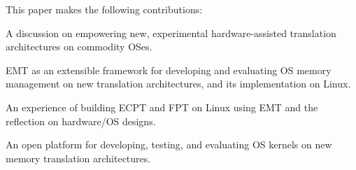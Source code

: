 
 This paper makes the following contributions:
\begin{packed_itemize}%
	\item A discussion on empowering new, experimental hardware-assisted translation architectures
		on commodity OSes.
	\item EMT as an extensible framework for developing and evaluating OS memory management 
		on new translation architectures,
		and its implementation on Linux.
	\item An experience of building ECPT and FPT on Linux using EMT and the reflection 
		on hardware/OS designs.
	\item An open platform for developing, testing, and evaluating OS kernels 
		on new memory translation architectures.
	\item {}
\end{packed_itemize}



